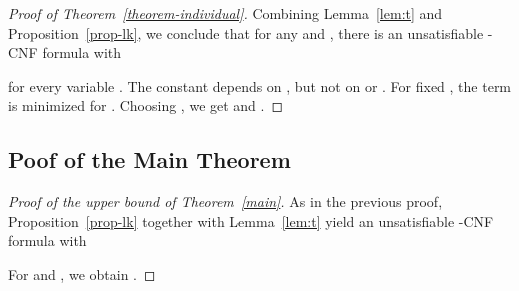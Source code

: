 \documentclass[a4paper, 11pt]{article}
\begin{document}
 \begin{proof}[Proof of Theorem~\ref{theorem-individual}]
   Combining Lemma~\ref{lem:t} and Proposition~\ref{prop-lk}, we
   conclude that for any  and ,
   there is an unsatisfiable -CNF formula  with
   
   for every variable . The constant  depends on , but not
   on  or . For fixed , the term  is minimized for .
   Choosing , we get  and .
 \end{proof}

 
 
\subsection{Poof of the Main Theorem}\label{section-lower-bound}


 \begin{proof}[Proof of the upper bound of Theorem~\ref{main}]
   As in the previous proof, Proposition~\ref{prop-lk} together
   with Lemma~\ref{lem:t} yield an unsatisfiable -CNF formula  
   with 
   
   For  and , we obtain .
 \end{proof}
 
\end{document}
